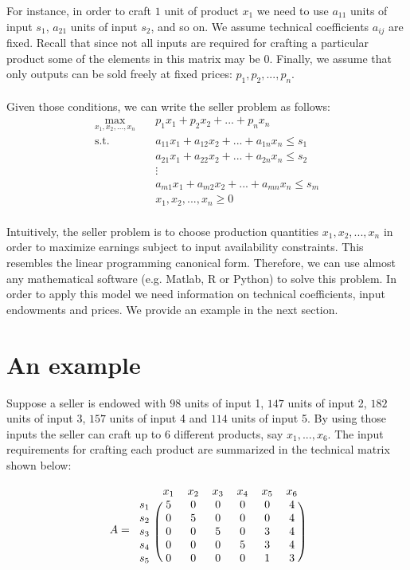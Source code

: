 \documentclass[12pt]{article}         %
\begin{document}
For instance, in order to craft $1$ unit of product $x_1$ we need to use $a_{11}$ units of input $s_1$, $a_{21}$ units of input $s_2$, and so on. We assume technical coefficients $a_{ij}$ are fixed. Recall that since not all inputs are required for crafting a particular product some of the elements in this matrix may be $0$. Finally, we assume that only outputs can be sold freely at fixed prices: $p_1, p_2,...,p_n$.\\
\\
Given those conditions, we can write the seller problem as follows:
\begin{equation}
\begin{aligned}
\max_{x_1,x_2,...,x_n} \quad & p_1x_1 + p_2x_2 + ... + p_nx_n \\
\textrm{s.t.} \quad & a_{11}x_1 + a_{12}x_2 + ... + a_{1n}x_n \leq s_1\\
  &a_{21}x_1 + a_{22}x_2 + ... + a_{2n}x_n \leq s_2\\
  &\vdots \\
  &a_{m1}x_1 + a_{m2}x_2 + ... + a_{mn}x_n \leq s_m\\
  &x_1,x_2,...,x_n\geq0    \\
\end{aligned}
\end{equation}

Intuitively, the seller problem is to choose production quantities $x_1,x_2,...,x_n$ in order to maximize earnings subject to input availability constraints. This resembles the linear programming canonical form. Therefore, we can use almost any mathematical software (e.g. Matlab, R or Python) to solve this problem. In order to apply this model we need information on technical coefficients, input endowments and prices. We provide an example in the next section.

\section{An example}
Suppose a seller is endowed with $98$ units of input 1, $147$ units of input 2, $182$ units of input 3, $157$ units of input 4 and $114$ units of input 5. By using those inputs the seller can craft up to 6 different products, say $x_1,...,x_6$. The input requirements for crafting each product are summarized in the technical matrix shown below:

\[
A =
\begin{blockarray}{ccccccc}
& x_1 & x_2 & x_3 & x_4 & x_5 & x_6 \\
\begin{block}{c(cccccc)}
  s_1 & 5 & 0 & 0 & 0 & 0 & 4  \\
  s_2 & 0 & 5 & 0 & 0 & 0 & 4  \\
  s_3 & 0 & 0 & 5 & 0 & 3 & 4  \\
  s_4 & 0 & 0 & 0 & 5 & 3 & 4  \\
  s_5 & 0 & 0 & 0 & 0 & 1 & 3  \\
\end{block}
\end{blockarray}
 \]
\end{document}
